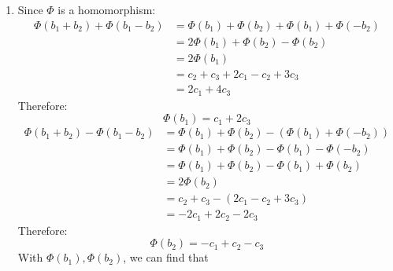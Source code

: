 \documentclass[12pt]{article}
\begin{document}
\begin{enumerate}[label=\alph*.]
\begin{enumerate}[label=(\roman*)]
\begin{equation*}
\begin{matrix}
                                        1/4 & 1/2  & 1/4\\
                                        1/2 & 0    & 1/2\\
                                        3/4 & -1/2 & -1/4
                                    \end{matrix}\right]
                                \end{equation*}
                    \end{enumerate}
                \item Since $\Phi$ is a homomorphism:
                    \begin{align*}
                        \Phi(b_1 + b_2) + \Phi(b_1 - b_2) &= \Phi(b_1) + \Phi(b_2) + \Phi(b_1) + \Phi(-b_2)\\
                        &= 2\Phi(b_1) + \Phi(b_2) - \Phi(b_2)\\
                        &= 2\Phi(b_1)\\
                        &= c_2 + c_3 + 2c_1 - c_2 + 3c_3\\
                        &= 2c_1 + 4c_3
                    \end{align*}
                    Therefore:
                    \begin{equation*}
                        \Phi(b_1) = c_1 + 2c_3
                    \end{equation*}
                    \begin{align*}
                        \Phi(b_1 + b_2) - \Phi(b_1 - b_2) &= \Phi(b_1) + \Phi(b_2) - (\Phi(b_1) + \Phi(-b_2))\\
                        &= \Phi(b_1) + \Phi(b_2) - \Phi(b_1) - \Phi(-b_2)\\
                        &= \Phi(b_1) + \Phi(b_2) - \Phi(b_1) + \Phi(b_2)\\
                        &= 2\Phi(b_2)\\
                        &= c_2 + c_3 - (2c_1 - c_2 + 3c_3)\\
                        &= -2c_1 + 2c_2 - 2c_3
                    \end{align*}
                    Therefore:
                    \begin{equation*}
                        \Phi(b_2) = -c_1 + c_2 - c_3
                    \end{equation*}
                    With $\Phi(b_1), \Phi(b_2)$, we can find that 
                    \begin{equation*}

\end{equation*}
\end{enumerate}
\end{document}
